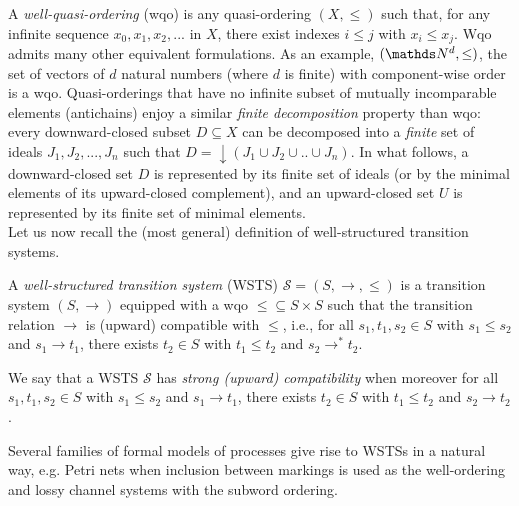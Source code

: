 \documentclass[runningheads]{llncs}
\begin{document}
 A {\em well-quasi-ordering} (wqo) is any quasi-ordering $(X,\leq)$ such that, for any infinite sequence $x_0, x_1, x_2, ...$ in $X$, there exist indexes $i \leq j$ with $x_i \leq  x_j$.
%
%
%
Wqo admits many other equivalent formulations. 
%
%
As an example, $(\N^d, \leq)$, the set of vectors of $d$ natural numbers (where $d$ is finite) with component-wise order is a wqo.
%
Quasi-orderings that have no 
infinite subset of mutually incomparable elements (antichains)
 enjoy a similar \emph{finite decomposition} property than wqo: every downward-closed subset $D \subseteq X$ can be decomposed into a \emph{finite} set of ideals $J_1, J_2,..., J_n$ such that $D = \downarrow (J_1 \cup J_2 \cup..\cup J_n)$.
%
%
In what follows, a downward-closed set $D$ is represented by its finite set of ideals (or by the minimal elements of its upward-closed complement), and an upward-closed set $U$ is represented by its finite set of minimal elements. \\

\noindent
Let us now recall the (most general) definition of well-structured transition systems.
\begin{definition}\cite{DBLP:journals/iandc/Finkel90,DBLP:journals/tcs/FinkelS01}
A {\em well-structured transition system} (WSTS)  $\mathscr{S}=(S, \rightarrow, \leq)$
is a transition system $(S, \rightarrow)$
equipped with a wqo ${\leq} \subseteq S \times S$ such that   
the transition relation $ \rightarrow$ is (upward) compatible with $\leq$, i.e., for all 
$s_1, t_1 , s_2 \in S$
	with $s_1 \leq s_2$  and $s_1 \rightarrow t_1$, there exists 
	$t_2 \in S$ with 
	$t_1 \leq t_2$ and $s_2 \rightarrow^{*} t_2$.
\end{definition}

We say that a WSTS $\mathscr{S}$ has \emph{strong (upward) compatibility} when moreover for all 
$s_1, t_1 , s_2 \in S$
	with $s_1 \leq s_2$  and $s_1 \rightarrow t_1$, there exists 
	$t_2 \in S$ with 
	$t_1 \leq t_2$ and $s_2 \rightarrow t_2$.

Several families of formal models of processes give rise to WSTSs in a natural way, e.g. Petri nets when inclusion between markings is used as the well-ordering and lossy channel systems with the subword ordering. 
\end{document}
